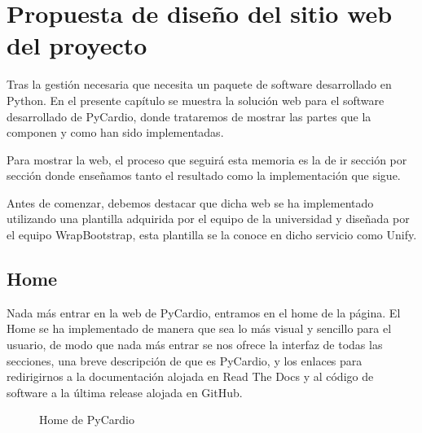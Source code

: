 \chapter{Propuesta de diseño del sitio web del proyecto}
\label{chap:webProp}
Tras la gestión necesaria que necesita un paquete de software desarrollado en Python. En el presente capítulo se muestra la solución web para el software desarrollado de PyCardio, donde trataremos de mostrar las partes que la componen y como han sido implementadas.

Para mostrar la web, el proceso que seguirá esta memoria es la de ir sección por sección donde enseñamos tanto el resultado como la implementación que sigue.

Antes de comenzar, debemos destacar que dicha web se ha implementado utilizando una plantilla adquirida por el equipo de la universidad y diseñada por el equipo WrapBootstrap, esta plantilla se la conoce en dicho servicio como Unify. 

\section{Home}
\label{sec:homeWeb}
Nada más entrar en la web de PyCardio, entramos en el home de la página. El Home se ha implementado de manera que sea lo más visual y sencillo para el usuario, de modo que nada más entrar se nos ofrece la interfaz de todas las secciones, una breve descripción de que es PyCardio, y los enlaces para redirigirnos a la documentación alojada en Read The Docs y al código de software a la última release alojada en GitHub. 

\begin{figure}[H]
    \centering
    \caption{Home de PyCardio}
    \label{fig:homePyCardio}
\end{figure}

